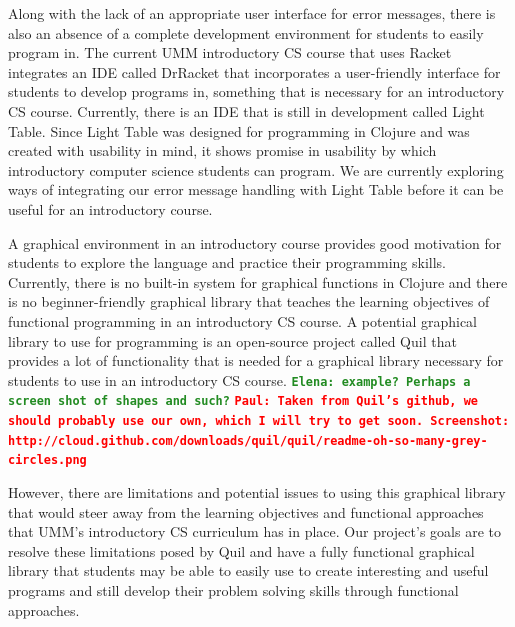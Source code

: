 \documentclass[12pt]{article}
\newcommand{\comment}[1]{{\bf \tt  {#1}}}
\newcommand{\emcomment}[1]{\textcolor{ForestGreen}{\comment{Elena: {#1}}}}
\newcommand{\pscomment}[1]{\textcolor{red}{\comment{Paul: {#1}}}}
\begin{document}
Along with the lack of an appropriate user interface for error messages, there is also an absence of a complete development environment for students to easily program in. The current UMM introductory CS course that uses Racket integrates an IDE called DrRacket that incorporates a user-friendly interface for students to develop programs in, something that is necessary for an introductory CS course.  Currently, there is an IDE that is still in development called Light Table.  Since Light Table was designed for programming in Clojure and was created with usability in mind, it shows promise in usability by which introductory computer science students can program. We are currently exploring ways of integrating our error message handling with Light Table before it can be useful for an introductory course.

A graphical environment in an introductory course provides good motivation for students to explore the language and practice their programming skills. Currently, there is no built-in system for graphical functions in Clojure and there is no beginner-friendly graphical library that teaches the learning objectives of functional programming in an introductory CS course. A potential graphical library to use for programming is an open-source project called Quil that provides a lot of functionality that is needed for a graphical library necessary for students to use in an introductory CS course.
\emcomment{example? Perhaps a screen shot of shapes and such?}
\pscomment{Taken from Quil's github, we should probably use our own, which I will try to get soon.  Screenshot: http://cloud.github.com/downloads/quil/quil/readme-oh-so-many-grey-circles.png}

However, there are limitations and potential issues to using this graphical library that would steer away from the learning objectives and functional approaches that UMM's introductory CS curriculum has in place. Our project’s goals are to resolve these limitations posed by Quil and have a fully functional graphical library that students may be able to easily use to create interesting and useful programs and still develop their problem solving skills through functional approaches.
\end{document}
